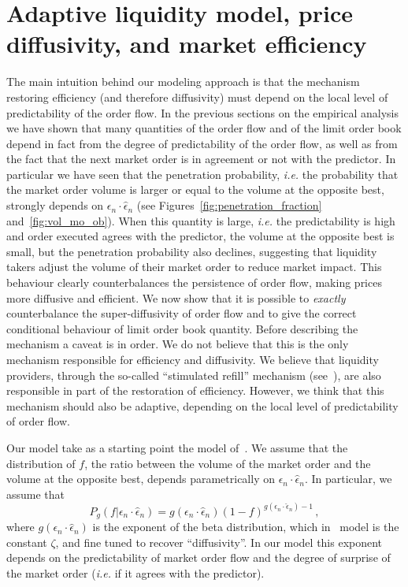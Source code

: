 \documentclass[12pt]{iopart}
\begin{document}
\section{Adaptive liquidity model, price diffusivity, and market efficiency}
\label{sec:Adaptive}
The main intuition behind our modeling approach is that the mechanism restoring efficiency (and therefore diffusivity) must depend on the local level of predictability of the order flow. In the previous sections on the empirical analysis we have shown that many quantities of the order flow and of the limit order book depend in fact from the degree of predictability of the order flow, as well as from the fact that the next market order is in agreement or not with the predictor. In particular we have seen that the penetration probability, \textit{i.e.} the probability that the market order volume is larger or equal to the volume at the opposite best, strongly depends on $\epsilon_n\cdot\hat{\epsilon}_n$ (see Figures~\ref{fig:penetration_fraction} and~\ref{fig:vol_mo_ob}). When this quantity is large, \textit{i.e.} the predictability is high and order executed agrees with the predictor, the volume at the opposite best is small, but the penetration probability also declines, suggesting that liquidity takers adjust the volume of their market order to reduce market impact. This behaviour clearly counterbalances the persistence of order flow, making prices more diffusive and efficient. We now show that it is possible to {\it exactly} counterbalance the super-diffusivity of order flow and to give the correct conditional behaviour of limit order book quantity. Before describing the mechanism a caveat is in order. We do not believe that this is the only mechanism responsible for efficiency and diffusivity. We believe that liquidity providers, through the so-called “stimulated refill” mechanism (see~\cite{eisler2012price, mastromatteo2013agent}), are also responsible in part of the restoration of efficiency. However, we think that this mechanism should also be adaptive, depending on the local level of predictability of order flow. 

Our model take as a starting point the model of~\cite{toth2011anomalous}. We assume that the distribution of $f$, the ratio between the volume of the market order and the volume at the opposite best, depends parametrically on  $\epsilon_n\cdot\hat{\epsilon}_n$. In particular, we assume that
\begin{equation*}
P_g(f|\epsilon_n\cdot\hat{\epsilon}_n)=g(\epsilon_n\cdot\hat{\epsilon}_n)(1-f)^{g(\epsilon_n\cdot\hat{\epsilon}_n)-1}\,,
\end{equation*}
where $g(\epsilon_n\cdot\hat{\epsilon}_n)$ is the exponent of the beta distribution, which in~\cite{toth2011anomalous} model is the constant $\zeta$, and fine tuned to recover “diffusivity”. In our model this exponent depends on the predictability of market order flow and the degree of surprise of the market order (\textit{i.e.} if it agrees with the predictor). 
\end{document}
